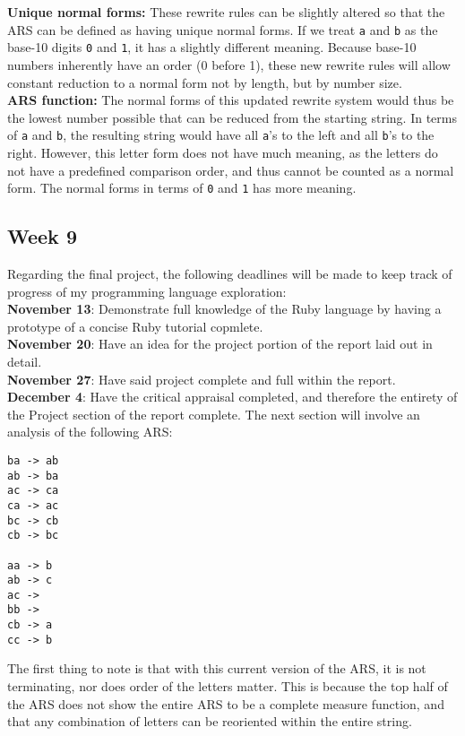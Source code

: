 \documentclass{article}
\theoremstyle{theorem}
\theoremstyle{definition}
\theoremstyle{remark}
\begin{document}
\noindent \textbf{Unique normal forms: } These rewrite rules can be slightly altered so that the ARS can be defined as having unique normal forms. If we treat \texttt{a} and \texttt{b} as the base-10 digits \texttt{0} and \texttt{1}, it has a slightly different meaning. Because base-10 numbers inherently have an order (0 before 1), these new rewrite rules will allow constant reduction to a normal form not by length, but by number size.\\

\noindent \textbf{ARS function: } The normal forms of this updated rewrite system would thus be the lowest number possible that can be reduced from the starting string. In terms of \texttt{a} and \texttt{b}, the resulting string would have all \texttt{a}'s to the left and all \texttt{b}'s to the right. However, this letter form does not have much meaning, as the letters do not have a predefined comparison order, and thus cannot be counted as a normal form. The normal forms in terms of \texttt{0} and \texttt{1} has more meaning.

\subsection{Week 9}
Regarding the final project, the following deadlines will be made to keep track of progress of my programming language exploration:\\

\noindent \textbf{November 13}: Demonstrate full knowledge of the Ruby language by having a prototype of a concise Ruby tutorial copmlete.\\

\noindent \textbf{November 20}: Have an idea for the project portion of the report laid out in detail.\\

\noindent \textbf{November 27}: Have said project complete and full within the report.\\

\noindent \textbf{December 4}: Have the critical appraisal completed, and therefore the entirety of the Project section of the report complete.
\newpage
\noindent The next section will involve an analysis of the following ARS:
\begin{lstlisting}
ba -> ab
ab -> ba
ac -> ca
ca -> ac
bc -> cb
cb -> bc
 
aa -> b
ab -> c
ac ->  
bb ->
cb -> a
cc -> b
\end{lstlisting}

\noindent The first thing to note is that with this current version of the ARS, it is not terminating, nor does order of the letters matter. This is because the top half of the ARS does not show the entire ARS to be a complete measure function, and that any combination of letters can be reoriented within the entire string. \\
\end{document}
